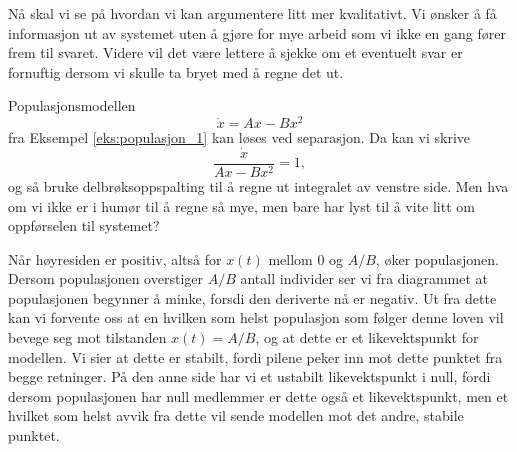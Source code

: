 \documentclass{article}
\theoremstyle{plain}
\theoremstyle{definition}
\theoremstyle{remark}
\newenvironment{ex}
{\pushQED{\qed}\renewcommand{\qedsymbol}{$\triangle$}\exx}
{\popQED\endexx}
\newcommand{\fcn}{x}
\begin{document}
Nå skal vi se på hvordan vi kan argumentere litt mer kvalitativt. Vi ønsker å få informasjon ut av systemet uten å gjøre for mye arbeid som vi ikke en gang fører frem til svaret. Videre vil det være lettere å sjekke om et eventuelt svar er fornuftig dersom vi skulle ta bryet med å regne det ut.

\begin{ex} \label{eks:populasjon_2}
    Populasjonsmodellen
    \begin{equation*}
        \dot{x} = A x - B x^2
    \end{equation*}
    fra Eksempel \ref{eks:populasjon_1} kan løses ved separasjon. Da kan vi skrive
    \begin{equation*}
        \frac{\dot{x}}{A x - B x^2} = 1,
    \end{equation*}
    og så bruke delbrøksoppspalting til å regne ut integralet av venstre side. Men hva om vi ikke er i humør til å regne så mye, men bare har lyst til å vite litt om oppførselen til systemet?

    \begin{center}
    \end{center}
    Når høyresiden er positiv, altså for $x(t)$ mellom $0$ og $A/B$, øker populasjonen. Dersom populasjonen overstiger $A/B$ antall individer ser vi fra diagrammet at populasjonen begynner å minke, forsdi den deriverte nå er negativ. Ut fra dette kan vi forvente oss at en hvilken som helst populasjon som følger denne loven vil bevege seg mot tilstanden $x(t) = A/B$, og at dette er et likevektspunkt for modellen. Vi sier at dette er stabilt, fordi pilene peker inn mot dette punktet fra begge retninger. På den anne side har vi et ustabilt likevektspunkt i null, fordi dersom populasjonen har null medlemmer er dette også et likevektspunkt, men et hvilket som helst avvik fra dette vil sende modellen mot det andre, stabile punktet.
\end{ex}
\end{document}
